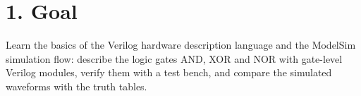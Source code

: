 \section*{1. Goal}
Learn the basics of the Verilog hardware description language and the ModelSim simulation flow: describe the logic gates AND, XOR and NOR with gate-level Verilog modules, verify them with a test bench, and compare the simulated waveforms with the truth tables.

